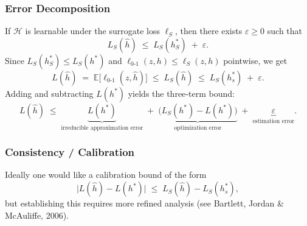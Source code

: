 \documentclass[11pt]{article}
\theoremstyle{plain} %
\begin{document}
\subsubsection{Error Decomposition}
If \(\mathcal{H}\) is learnable under the surrogate loss \(\ell_S\), then there exists \(\varepsilon\ge0\) such that
\[
  L_S(\hat h)\;\le\;L_S(h^*_S)\;+\;\varepsilon.
\]
Since \(L_S(h^*_S)\le L_S(h^*)\) and \(\ell_{0\text{-}1}(z,h)\le\ell_S(z,h)\) pointwise, we get
\[
  L(\hat h)
  \;=\;\mathbb{E}\bigl[\ell_{0\text{-}1}(z,\hat h)\bigr]
  \;\le\;L_S(\hat h)
  \;\le\;L_S(h^*_s)\;+\;\varepsilon.
\]
Adding and subtracting \(L(h^*)\) yields the three‐term bound:
\[
  L(\hat h)
  \;\le\;
  \underbrace{L(h^*)}_{\text{irreducible approximation error}}
  \;+\;
  \underbrace{\bigl(L_S(h^*)-L(h^*)\bigr)}_{\text{optimization error}}
  \;+\;
  \underbrace{\varepsilon}_{\text{estimation error}}.
\]



\subsubsection{Consistency / Calibration}
Ideally one would like a calibration bound of the form
\[
  \bigl|L(\hat h)-L(h^*)\bigr|
  \;\le\;
  L_S(\hat h)-L_S(h^*_s),
\]
but establishing this requires more refined analysis (see Bartlett, Jordan \& McAuliffe, 2006).
\end{document}
